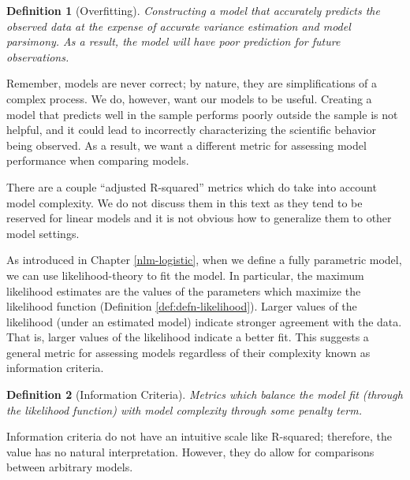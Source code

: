 \documentclass[
]{book}
\theoremstyle{plain}
\theoremstyle{mydefn}
\newtheorem{definition}{Definition}[chapter]
\theoremstyle{myexmpl}
\theoremstyle{remark}
\begin{document}
\begin{definition}[Overfitting]
\protect\hypertarget{def:defn-overfitting}{}{\label{def:defn-overfitting} {} }Constructing a model that accurately predicts the observed data at the expense of accurate variance estimation and model parsimony. As a result, the model will have poor prediction for future observations.
\end{definition}

Remember, models are never correct; by nature, they are simplifications of a complex process. We do, however, want our models to be useful. Creating a model that predicts well in the sample performs poorly outside the sample is not helpful, and it could lead to incorrectly characterizing the scientific behavior being observed. As a result, we want a different metric for assessing model performance when comparing models.

\begin{rmdtip}
There are a couple ``adjusted R-squared'' metrics which do take into account model complexity. We do not discuss them in this text as they tend to be reserved for linear models and it is not obvious how to generalize them to other model settings.
\end{rmdtip}

As introduced in Chapter \ref{nlm-logistic}, when we define a fully parametric model, we can use likelihood-theory to fit the model. In particular, the maximum likelihood estimates are the values of the parameters which maximize the likelihood function (Definition \ref{def:defn-likelihood}). Larger values of the likelihood (under an estimated model) indicate stronger agreement with the data. That is, larger values of the likelihood indicate a better fit. This suggests a general metric for assessing models regardless of their complexity known as information criteria.

\begin{definition}[Information Criteria]
\protect\hypertarget{def:defn-information-criteria}{}{\label{def:defn-information-criteria} {} }Metrics which balance the model fit (through the likelihood function) with model complexity through some penalty term.
\end{definition}

Information criteria do not have an intuitive scale like R-squared; therefore, the value has no natural interpretation. However, they do allow for comparisons between arbitrary models.
\end{document}
